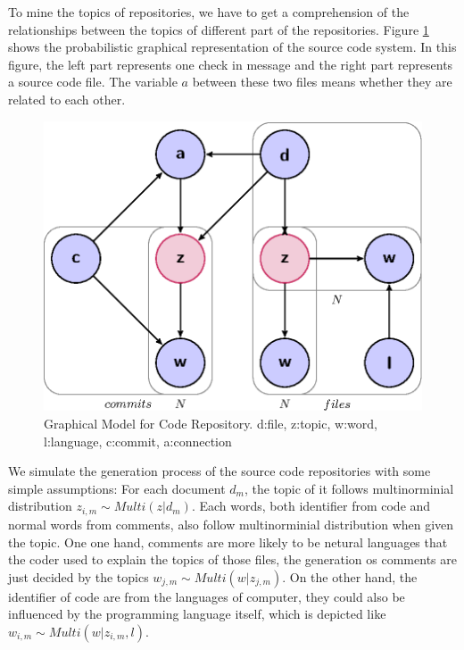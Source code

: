 To mine the topics of repositories, we have to get a comprehension of the 
relationships between the topics of different part of the repositories.
Figure \ref{fig:spet} shows the probabilistic graphical representation of the 
source code system. In this figure, the left part represents one check in 
message and the right part represents a source code file. The variable $a$ 
between these two files means whether they are related to each other.
\begin{figure}[h]
\begin{center}
\includegraphics[width=0.7\columnwidth]{figure/seprate.eps}
\caption{Graphical Model for Code Repository.
d:file, z:topic, w:word, l:language, c:commit, a:connection}
\label{fig:spet}
\end{center}
\end{figure}

We simulate the generation process of the source code repositories with some 
simple assumptions:
For each document $d_m$, the topic of it follows multinorminial distribution $z_{i,m} \sim Multi(z|d_m)$.
Each words, both identifier from code and normal words from comments, also 
follow multinorminial distribution when given the topic. 
One one hand, comments are more likely to be netural languages that the coder used to explain the topics
of those files, the generation os comments are just decided by the topics $w_{j,m} \sim Multi(w|z_{j,m})$. 
On the other hand, the identifier of code are from the languages
of computer, they could also be influenced by the programming 
language itself, which is depicted like $w_{i,m} \sim Multi(w|z_{i,m},l)$.

